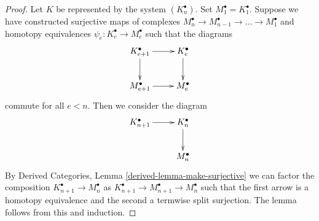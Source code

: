 \documentclass[10pt,a4paper]{amsart}
\theoremstyle{plain}
\theoremstyle{definition}
\theoremstyle{remark}
\numberwithin{equation}{subsection}
\begin{document}
\begin{proof}
Let $K$ be represented by the system $(K_n^\bullet)$. Set
$M_1^\bullet = K_1^\bullet$. Suppose we have constructed surjective maps
of complexes $M_n^\bullet \to M_{n - 1}^\bullet \to \ldots \to M_1^\bullet$
and homotopy equivalences $\psi_e : K_e^\bullet \to M_e^\bullet$ such that
the diagrams
$$
\xymatrix{
K_{e + 1}^\bullet \ar[d] \ar[r] & K_e^\bullet \ar[d] \\
M_{e + 1}^\bullet \ar[r] & M_e^\bullet
}
$$
commute for all $e < n$. Then we consider the diagram
$$
\xymatrix{
K_{n + 1}^\bullet \ar[r] & K_n^\bullet \ar[d] \\
& M_n^\bullet
}
$$
By Derived Categories, Lemma \ref{derived-lemma-make-surjective}
we can factor the composition $K_{n + 1}^\bullet \to M_n^\bullet$ as
$K_{n + 1}^\bullet \to M_{n + 1}^\bullet \to M_n^\bullet$
such that the first arrow is a homotopy equivalence and the
second a termwise split surjection. The lemma follows
from this and induction.
\end{proof}
\end{document}
